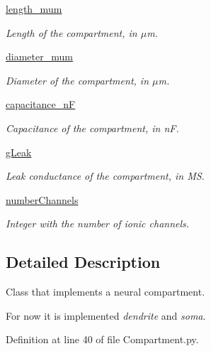\begin{DoxyCompactItemize}
\hyperlink{class_compartment_1_1_compartment_a8154742b0082eea301690e3566e477b6}{length\-\_\-mum}
\begin{DoxyCompactList}\small\item\em Length of the compartment, in $\mu$m. \end{DoxyCompactList}\item 
\hyperlink{class_compartment_1_1_compartment_aacb7db7022f5d3534d17642d47281cbb}{diameter\-\_\-mum}
\begin{DoxyCompactList}\small\item\em Diameter of the compartment, in $\mu$m. \end{DoxyCompactList}\item 
\hyperlink{class_compartment_1_1_compartment_ac7d7462a45d4d623ed688c187c9184aa}{capacitance\-\_\-n\-F}
\begin{DoxyCompactList}\small\item\em Capacitance of the compartment, in n\-F. \end{DoxyCompactList}\item 
\hyperlink{class_compartment_1_1_compartment_a10d50da6a622982a6483c7cd78482bde}{g\-Leak}
\begin{DoxyCompactList}\small\item\em Leak conductance of the compartment, in M\-S. \end{DoxyCompactList}\item 
\hyperlink{class_compartment_1_1_compartment_a0fa96147f76e7814f30610027ed425df}{number\-Channels}
\begin{DoxyCompactList}\small\item\em Integer with the number of ionic channels. \end{DoxyCompactList}\end{DoxyCompactItemize}


\subsection{Detailed Description}
Class that implements a neural compartment. 

For now it is implemented {\itshape dendrite} and {\itshape soma}. 

Definition at line 40 of file Compartment.\-py.



